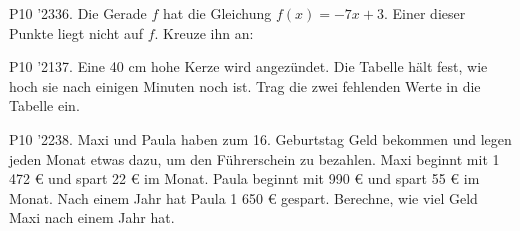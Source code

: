 \documentclass[11pt]{article}
\begin{document}
\pfgruppe{}
\begin{pfaufg}{P10 ’23}{36.}{}
Die Gerade $f$ hat die Gleichung $f(x) = -7x + 3$. Einer dieser Punkte liegt nicht auf $f$. Kreuze ihn an:
\end{pfaufg}
\pfgruppe{}
\begin{pfaufg}{P10 ’21}{37.}{}
Eine 40 cm hohe Kerze wird angezündet. Die Tabelle hält fest, wie hoch sie nach einigen Minuten noch ist. Trag die zwei fehlenden Werte in die Tabelle ein.
\par\smallskip\noindent {}\par
{}
\end{pfaufg}
\pfgruppe{}
\begin{pfaufg}{P10 ’22}{38.}{}
Maxi und Paula haben zum 16. Geburtstag Geld bekommen und legen jeden Monat etwas dazu, um den Führerschein zu bezahlen. Maxi beginnt mit 1 472 € und spart 22 € im Monat. Paula beginnt mit 990 € und spart 55 € im Monat. Nach einem Jahr hat Paula 1 650 € gespart. Berechne, wie viel Geld Maxi nach einem Jahr hat.
\par\smallskip\noindent {}\par
{}
\end{pfaufg}
\pfgruppe{}
\end{document}

